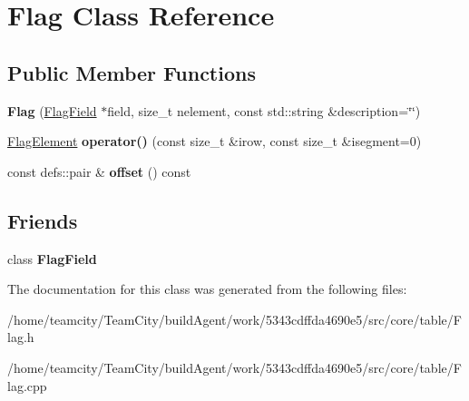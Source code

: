 \hypertarget{classFlag}{}\section{Flag Class Reference}
\label{classFlag}
\subsection*{Public Member Functions}
\begin{DoxyCompactItemize}
\item 
{\bfseries Flag} (\hyperlink{classFlagField}{Flag\+Field} $\ast$field, size\+\_\+t nelement, const std\+::string \&description=\char`\"{}\char`\"{})\hypertarget{classFlag_ac71458781931b25692e39976794cef5f}{}\label{classFlag_ac71458781931b25692e39976794cef5f}

\item 
\hyperlink{classFlagElement}{Flag\+Element} {\bfseries operator()} (const size\+\_\+t \&irow, const size\+\_\+t \&isegment=0)\hypertarget{classFlag_adbaa4f7306e34de940aa6177e3ef62de}{}\label{classFlag_adbaa4f7306e34de940aa6177e3ef62de}

\item 
const defs\+::pair \& {\bfseries offset} () const \hypertarget{classFlag_aa0df9fa3439c2cde0b35154b5d879de8}{}\label{classFlag_aa0df9fa3439c2cde0b35154b5d879de8}

\end{DoxyCompactItemize}
\subsection*{Friends}
\begin{DoxyCompactItemize}
\item 
class {\bfseries Flag\+Field}\hypertarget{classFlag_a955858e82156003d22c485ab29f79032}{}\label{classFlag_a955858e82156003d22c485ab29f79032}

\end{DoxyCompactItemize}


The documentation for this class was generated from the following files\+:\begin{DoxyCompactItemize}
\item 
/home/teamcity/\+Team\+City/build\+Agent/work/5343cdffda4690e5/src/core/table/Flag.\+h\item 
/home/teamcity/\+Team\+City/build\+Agent/work/5343cdffda4690e5/src/core/table/Flag.\+cpp\end{DoxyCompactItemize}
